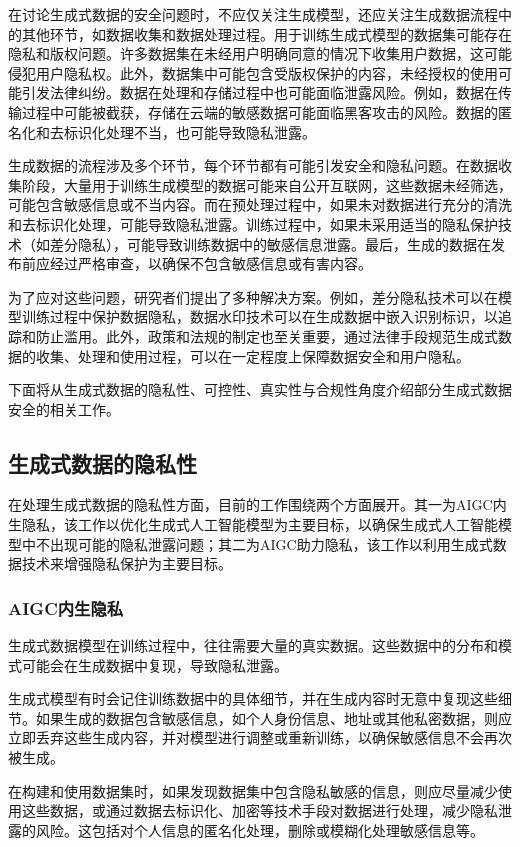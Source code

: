 \documentclass[a4paper]{nuist}
\begin{document}
在讨论生成式数据的安全问题时，不应仅关注生成模型，还应关注生成数据流程中的其他环节，如数据收集和数据处理过程。用于训练生成式模型的数据集可能存在隐私和版权问题。许多数据集在未经用户明确同意的情况下收集用户数据，这可能侵犯用户隐私权。此外，数据集中可能包含受版权保护的内容，未经授权的使用可能引发法律纠纷。数据在处理和存储过程中也可能面临泄露风险。例如，数据在传输过程中可能被截获，存储在云端的敏感数据可能面临黑客攻击的风险。数据的匿名化和去标识化处理不当，也可能导致隐私泄露。

生成数据的流程涉及多个环节，每个环节都有可能引发安全和隐私问题。在数据收集阶段，大量用于训练生成模型的数据可能来自公开互联网，这些数据未经筛选，可能包含敏感信息或不当内容。而在预处理过程中，如果未对数据进行充分的清洗和去标识化处理，可能导致隐私泄露。训练过程中，如果未采用适当的隐私保护技术（如差分隐私），可能导致训练数据中的敏感信息泄露。最后，生成的数据在发布前应经过严格审查，以确保不包含敏感信息或有害内容。

为了应对这些问题，研究者们提出了多种解决方案。例如，差分隐私技术可以在模型训练过程中保护数据隐私，数据水印技术可以在生成数据中嵌入识别标识，以追踪和防止滥用。此外，政策和法规的制定也至关重要，通过法律手段规范生成式数据的收集、处理和使用过程，可以在一定程度上保障数据安全和用户隐私。

下面将从生成式数据的隐私性、可控性、真实性与合规性角度介绍部分生成式数据安全的相关工作。

\subsection{生成式数据的隐私性}

在处理生成式数据的隐私性方面，目前的工作围绕两个方面展开。其一为AIGC内生隐私，该工作以优化生成式人工智能模型为主要目标，以确保生成式人工智能模型中不出现可能的隐私泄露问题；其二为AIGC助力隐私，该工作以利用生成式数据技术来增强隐私保护为主要目标。

\subsubsection{AIGC内生隐私}

生成式数据模型在训练过程中，往往需要大量的真实数据。这些数据中的分布和模式可能会在生成数据中复现，导致隐私泄露。

生成式模型有时会记住训练数据中的具体细节，并在生成内容时无意中复现这些细节。如果生成的数据包含敏感信息，如个人身份信息、地址或其他私密数据，则应立即丢弃这些生成内容，并对模型进行调整或重新训练，以确保敏感信息不会再次被生成。

在构建和使用数据集时，如果发现数据集中包含隐私敏感的信息，则应尽量减少使用这些数据，或通过数据去标识化、加密等技术手段对数据进行处理，减少隐私泄露的风险。这包括对个人信息的匿名化处理，删除或模糊化处理敏感信息等。
\end{document}
